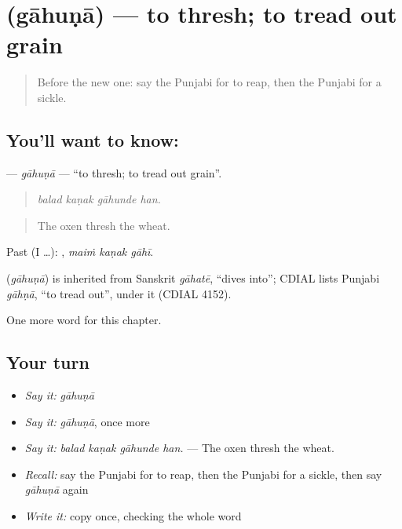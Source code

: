\section[\texorpdfstring{\pa{ਗਾਹੁਣਾ} (gāhuṇā)}{ਗਾਹੁਣਾ (gāhuṇā)}]{ (gāhuṇā) — to thresh; to tread out grain}

\label{lesson:PA-C305-gahuna}



\begin{quote}
Before the new one: say the Punjabi for to reap, then the Punjabi for a sickle.
\end{quote}

\subsection*{You'll want to know: }
\textbf{} — \emph{gāhuṇā} — \textquotedblleft{}to thresh; to tread out grain\textquotedblright{}.

\begin{quote}
   
\end{quote}

\begin{quote}
\emph{balad kaṇak gāhunde han.}
\end{quote}

\begin{quote}
The oxen thresh the wheat.
\end{quote}

Past (I …):   , \emph{maiṁ kaṇak gāhī}.

\begin{cousinweb}
\textbf{} (\emph{gāhuṇā}) is inherited from Sanskrit \emph{gāhatē}, \textquotedblleft{}dives into\textquotedblright{}; CDIAL lists Punjabi \emph{gāhṇā}, \textquotedblleft{}to tread out\textquotedblright{}, under it (CDIAL 4152).
\end{cousinweb}

\begin{grammarlens}[title={What you've built}]
One more word for this chapter.
\end{grammarlens}

\subsection*{Your turn}
\begin{itemize}
\raggedright
  \item \emph{Say it:} \emph{gāhuṇā}
  \item \emph{Say it:} \emph{gāhuṇā}, once more
  \item \emph{Say it:} \emph{balad kaṇak gāhunde han.} — The oxen thresh the wheat.
  \item \emph{Recall:} say the Punjabi for to reap, then the Punjabi for a sickle, then say \emph{gāhuṇā} again
  \item \emph{Write it:} copy \textbf{} once, checking the whole word
\end{itemize}

